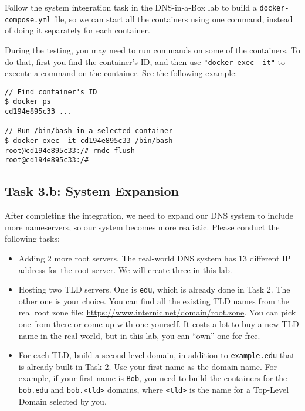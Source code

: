 Follow the system integration task in the DNS-in-a-Box lab to 
build a \texttt{docker-compose.yml} file, so we can
start all the containers using one command, instead of doing 
it separately for each container. 


During the testing, you may need to run commands on some of the containers.
To do that, first you find the container's ID, and then use
\texttt{"docker exec -it"} to execute a command on the container. See
the following example:

\begin{lstlisting}
// Find container's ID
$ docker ps
cd194e895c33 ...

// Run /bin/bash in a selected container
$ docker exec -it cd194e895c33 /bin/bash
root@cd194e895c33:/# rndc flush
root@cd194e895c33:/#
\end{lstlisting}




\subsection{Task 3.b: System Expansion}


After completing the integration, we need to expand our
DNS system to include more nameservers, so our system becomes more 
realistic. Please conduct the following tasks:

\begin{itemize}
\item Adding 2 more root servers. The real-world DNS system has 13 different
IP address for the root server. We will create three in this lab.

\item Hosting two TLD servers. One is \texttt{edu}, which is already
done in Task 2. The other one is your choice.
You can find all the existing TLD names from the
real root zone file: \url{https://www.internic.net/domain/root.zone}.
You can pick one from there or come up with one yourself.
It costs a lot to buy a new TLD name in the real world, but in this lab, you
can ``own'' one for free.

\item For each TLD, build a second-level domain, in
addition to \texttt{example.edu} that is already built in Task 2.
Use your first name as the domain name.
For example, if your first name is \texttt{Bob}, you need to build the containers
for the \texttt{bob.edu} and \texttt{bob.<tld>} domains,
where \texttt{<tld>} is the name for a Top-Level Domain selected
by you.
\end{itemize}


